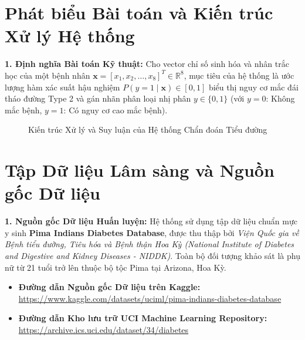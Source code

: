 \documentclass[12pt,a4paper]{report}
\begin{document}
\section{Phát biểu Bài toán và Kiến trúc Xử lý Hệ thống}
\textbf{1. Định nghĩa Bài toán Kỹ thuật:}
Cho vector chỉ số sinh hóa và nhân trắc học của một bệnh nhân $\mathbf{x} = [x_1, x_2, \dots, x_8]^T \in \mathbb{R}^8$, mục tiêu của hệ thống là ước lượng hàm xác suất hậu nghiệm $P(y=1 \mid \mathbf{x}) \in [0, 1]$ biểu thị nguy cơ mắc đái tháo đường Type 2 và gán nhãn phân loại nhị phân $y \in \{0, 1\}$ (với $y=0$: Không mắc bệnh, $y=1$: Có nguy cơ cao mắc bệnh).

\begin{figure}[H]
\centering
{}
\caption{Kiến trúc Xử lý và Suy luận của Hệ thống Chẩn đoán Tiểu đường}
\label{fig:diabetes_arch}
\end{figure}

\section{Tập Dữ liệu Lâm sàng và Nguồn gốc Dữ liệu}
\textbf{1. Nguồn gốc Dữ liệu Huấn luyện:}
Hệ thống sử dụng tập dữ liệu chuẩn mực y sinh \textbf{Pima Indians Diabetes Database}, được thu thập bởi \textit{Viện Quốc gia về Bệnh tiểu đường, Tiêu hóa và Bệnh thận Hoa Kỳ (National Institute of Diabetes and Digestive and Kidney Diseases - NIDDK)}. Toàn bộ đối tượng khảo sát là phụ nữ từ 21 tuổi trở lên thuộc bộ tộc Pima tại Arizona, Hoa Kỳ.
\begin{itemize}[leftmargin=1.5em]
    \item \textbf{Đường dẫn Nguồn gốc Dữ liệu trên Kaggle:} \url{https://www.kaggle.com/datasets/uciml/pima-indians-diabetes-database}
    \item \textbf{Đường dẫn Kho lưu trữ UCI Machine Learning Repository:} \url{https://archive.ics.uci.edu/dataset/34/diabetes}
\end{itemize}
\end{document}
